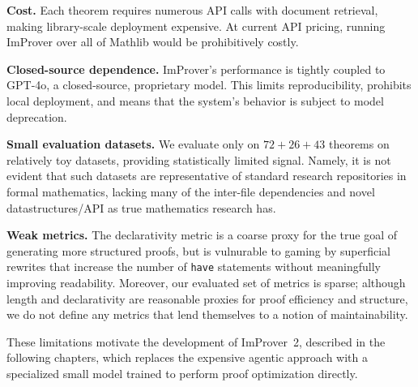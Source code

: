 \textbf{Cost.} Each theorem requires numerous API calls with document retrieval, making library-scale deployment expensive. At current API pricing, running ImProver over all of Mathlib would be prohibitively costly.

\textbf{Closed-source dependence.} ImProver's performance is tightly coupled to GPT-4o, a closed-source, proprietary model. This limits reproducibility, prohibits local deployment, and means that the system's behavior is subject to model deprecation.

\textbf{Small evaluation datasets.} We evaluate only on $72 + 26 + 43$ theorems on relatively toy datasets, providing statistically limited signal. Namely, it is not evident that such datasets are representative of standard research repositories in formal mathematics, lacking many of the inter-file dependencies and novel datastructures/API as true mathematics research has.

\textbf{Weak metrics.} The declarativity metric is a coarse proxy for the true goal of generating more structured proofs, but is vulnurable to gaming by superficial rewrites that increase the number of \texttt{have} statements without meaningfully improving readability. Moreover, our evaluated set of metrics is sparse; although length and declarativity are reasonable proxies for proof efficiency and structure, we do not define any metrics that lend themselves to a notion of maintainability.


These limitations motivate the development of ImProver~2, described in the following chapters, which replaces the expensive agentic approach with a specialized small model trained to perform proof optimization directly.
